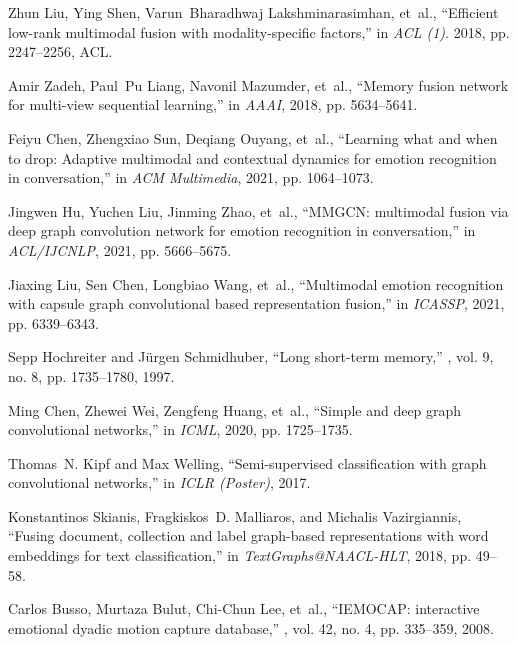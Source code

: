 \documentclass{article}
\begin{document}
\begin{thebibliography}{10}
  Zhun Liu, Ying Shen, Varun~Bharadhwaj Lakshminarasimhan, et~al.,
  \newblock ``Efficient low-rank multimodal fusion with modality-specific
    factors,''
  \newblock in {\em {ACL} {(1)}}. 2018, pp. 2247--2256, ACL.
  
  Amir Zadeh, Paul~Pu Liang, Navonil Mazumder, et~al.,
  \newblock ``Memory fusion network for multi-view sequential learning,''
  \newblock in {\em {AAAI}}, 2018, pp. 5634--5641.
  
  Feiyu Chen, Zhengxiao Sun, Deqiang Ouyang, et~al.,
  \newblock ``Learning what and when to drop: Adaptive multimodal and contextual
    dynamics for emotion recognition in conversation,''
  \newblock in {\em {ACM} Multimedia}, 2021, pp. 1064--1073.
  
  Jingwen Hu, Yuchen Liu, Jinming Zhao, et~al.,
  \newblock ``{MMGCN:} multimodal fusion via deep graph convolution network for
    emotion recognition in conversation,''
  \newblock in {\em {ACL/IJCNLP}}, 2021, pp. 5666--5675.
  
  Jiaxing Liu, Sen Chen, Longbiao Wang, et~al.,
  \newblock ``Multimodal emotion recognition with capsule graph convolutional
    based representation fusion,''
  \newblock in {\em {ICASSP}}, 2021, pp. 6339--6343.
  
  Sepp Hochreiter and J{\"{u}}rgen Schmidhuber,
  \newblock ``Long short-term memory,''
  , vol. 9, no. 8, pp. 1735--1780, 1997.
  
  Ming Chen, Zhewei Wei, Zengfeng Huang, et~al.,
  \newblock ``Simple and deep graph convolutional networks,''
  \newblock in {\em {ICML}}, 2020, pp. 1725--1735.
  
  Thomas~N. Kipf and Max Welling,
  \newblock ``Semi-supervised classification with graph convolutional networks,''
  \newblock in {\em {ICLR} (Poster)}, 2017.
  
  Konstantinos Skianis, Fragkiskos~D. Malliaros, and Michalis Vazirgiannis,
  \newblock ``Fusing document, collection and label graph-based representations
    with word embeddings for text classification,''
  \newblock in {\em TextGraphs@NAACL-HLT}, 2018, pp. 49--58.
  
  Carlos Busso, Murtaza Bulut, Chi{-}Chun Lee, et~al.,
  \newblock ``{IEMOCAP:} interactive emotional dyadic motion capture database,''
  , vol. 42, no. 4, pp. 335--359, 2008.
  

\end{thebibliography}
\end{document}

